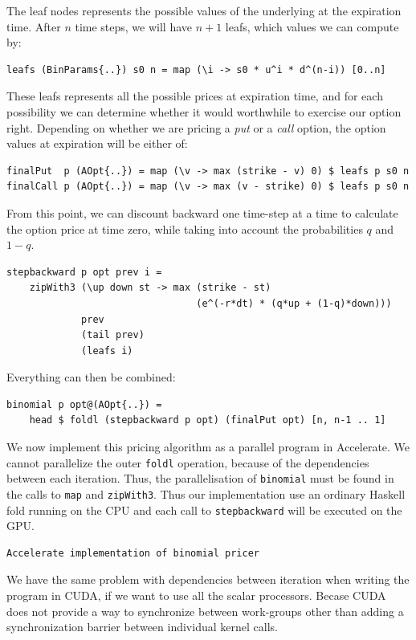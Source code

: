 \documentclass{llncs2e/llncs}
\begin{document}
The leaf nodes represents the possible values of the underlying at
the expiration time. After $n$ time steps, we will have $n+1$ leafs, which
values we can compute by:
\begin{verbatim}
leafs (BinParams{..}) s0 n = map (\i -> s0 * u^i * d^(n-i)) [0..n]
\end{verbatim}
These leafs represents all the possible prices at expiration time, and
for each possibility we can determine whether it would worthwhile to
exercise our option right. Depending on whether we are pricing a
\emph{put} or a \emph{call} option, the option values at expiration
will be either of:
\begin{verbatim}
finalPut  p (AOpt{..}) = map (\v -> max (strike - v) 0) $ leafs p s0 n
finalCall p (AOpt{..}) = map (\v -> max (v - strike) 0) $ leafs p s0 n
\end{verbatim}
From this point, we can discount backward one time-step at a time to
calculate the option price at time zero, while taking into account the
probabilities $q$ and $1-q$.
\begin{verbatim}
stepbackward p opt prev i =
    zipWith3 (\up down st -> max (strike - st) 
                                 (e^(-r*dt) * (q*up + (1-q)*down)))
             prev
             (tail prev)
             (leafs i)
\end{verbatim}
Everything can then be combined:
\begin{verbatim}
binomial p opt@(AOpt{..}) =
    head $ foldl (stepbackward p opt) (finalPut opt) [n, n-1 .. 1]
\end{verbatim}

We now implement this pricing algorithm as a parallel program in
Accelerate. We cannot parallelize the outer \verb|foldl| operation,
because of the dependencies between each iteration. Thus, the
parallelisation of \verb|binomial| must be found in the calls to
\verb|map| and \verb|zipWith3|. Thus our implementation use an
ordinary Haskell fold running on the CPU and each call to
\verb|stepbackward| will be executed on the GPU.
\begin{verbatim}
Accelerate implementation of binomial pricer
\end{verbatim}

We have the same problem with dependencies between iteration when
writing the program in CUDA, if we want to use all the scalar
processors. Becase CUDA does not provide a way to synchronize between
work-groups other than adding a synchronization barrier between
individual kernel calls.
\end{document}
